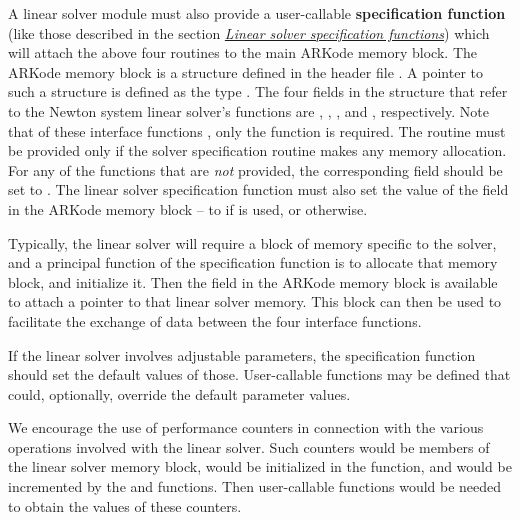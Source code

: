 \documentclass[letterpaper,10pt,english]{sphinxmanual}
\begin{document}
A linear solver module must also provide a user-callable \textbf{specification
function} (like those described in the section
{\hyperref[c_interface/User_callable:cinterface-linearsolvers]{\emph{Linear solver specification functions}}}) which will attach the above four
routines to the main ARKode memory block. The ARKode memory block is a
structure defined in the header file . A pointer to
such a structure is defined as the type . The four
fields in the  structure that refer to the Newton system
linear solver's functions are , ,
, and , respectively.  Note that of these
interface functions , only the {\hyperref[linear_solvers/custom:lsolve]{}} function is
required. The {\hyperref[linear_solvers/custom:lfree]{}} routine must be provided only if the
solver specification routine makes any memory allocation.  For any of
the functions that are \emph{not} provided, the corresponding field should
be set to . The linear
solver specification function must also set the value of the field
 in the ARKode memory block -- to  if
{\hyperref[linear_solvers/custom:lsetup]{}} is used, or  otherwise.

Typically, the linear solver will require a block of memory specific
to the solver, and a principal function of the specification function
is to allocate that memory block, and initialize it.  Then the field
 in the ARKode memory block  is available to
attach a pointer to that linear solver memory.  This block can then be
used to facilitate the exchange of data between the four interface
functions.

If the linear solver involves adjustable parameters, the specification
function should set the default values of those.  User-callable
functions may be defined that could, optionally, override the default
parameter values.

We encourage the use of performance counters in connection with the various
operations involved with the linear solver.  Such counters would be
members of the linear solver memory block, would be initialized in the
{\hyperref[linear_solvers/custom:linit]{}} function, and would be incremented by the
{\hyperref[linear_solvers/custom:lsetup]{}} and {\hyperref[linear_solvers/custom:lsolve]{}} functions.  Then
user-callable functions would be needed to obtain the values of these
counters.
\end{document}
